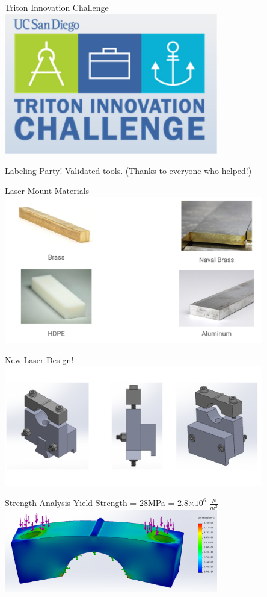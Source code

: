 \begin{frame}{Triton Innovation Challenge}
  \centering
  \includegraphics[height=0.7\textheight,width=0.7\textwidth,keepaspectratio]{images/TritonInnovation.png}
\end{frame}

\begin{frame}{Labeling Party!}
  Validated tools. (Thanks to everyone who helped!)
\end{frame}

\begin{frame}{Laser Mount Materials}
  \centering
  \includegraphics[height=0.9\textheight,width=0.85\textwidth,keepaspectratio]{images/HWMaterials.png}
\end{frame}

\begin{frame}{New Laser Design!}
  \centering
  \includegraphics[height=0.9\textheight,width=0.85\textwidth,keepaspectratio]{images/NewLaserDesign.png}
\end{frame}

\begin{frame}{Strength Analysis} 
  \centering
  Yield Strength = 28MPa = 2.8$\times 10^6$ $\frac{N}{m^2}$ \\[12pt]
  \includegraphics[height=0.7\textheight,width=0.7\textwidth,keepaspectratio]{images/StrengthAnalysis.png}
\end{frame}